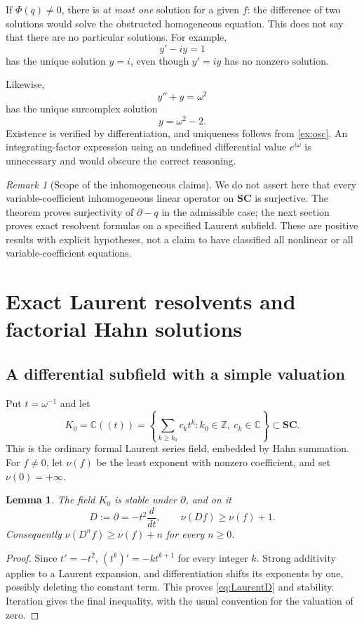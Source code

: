 \documentclass[11pt,letterpaper]{article}
\numberwithin{equation}{section}
\newtheorem{lemma}[lemma]{Lemma}
\theoremstyle{definition}
\theoremstyle{remark}
\newtheorem{remark}[remark]{Remark}
\newcommand{\SC}{\mathbf{SC}}
\newcommand{\C}{\mathbb C}
\newcommand{\Z}{\mathbb Z}
\newcommand{\der}{\partial}
\begin{document}
If $\Phi(q)\ne0$, there is \emph{at most one} solution for a given $f$: the difference of two solutions would solve the obstructed homogeneous equation. This does not say that there are no particular solutions. For example,
\[
 y'-iy=1
\]
has the unique solution $y=i$, even though $y'=iy$ has no nonzero solution.

Likewise,
\[
 y''+y=\omega^2
\]
has the unique surcomplex solution
\[
 y=\omega^2-2.
\]
Existence is verified by differentiation, and uniqueness follows from \cref{ex:osc}. An integrating-factor expression using an undefined differential value $e^{i\omega}$ is unnecessary and would obscure the correct reasoning.

\begin{remark}[Scope of the inhomogeneous claims]
We do not assert here that every variable-coefficient inhomogeneous linear operator on $\SC$ is surjective. The theorem proves surjectivity of $\der-q$ in the admissible case; the next section proves exact resolvent formulas on a specified Laurent subfield. These are positive results with explicit hypotheses, not a claim to have classified all nonlinear or all variable-coefficient equations.
\end{remark}

\section{Exact Laurent resolvents and factorial Hahn solutions}\label{sec:resolvent}

\subsection{A differential subfield with a simple valuation}
Put $t=\omega^{-1}$ and let
\[
 K_0=\C((t))=\left\{\sum_{k\geq k_0}c_kt^k:
 k_0\in\Z,\ c_k\in\C\right\}\subset\SC.
\]
This is the ordinary formal Laurent series field, embedded by Hahn summation. For $f\ne0$, let $\nu(f)$ be the least exponent with nonzero coefficient, and set $\nu(0)=+\infty$.

\begin{lemma}\label{lem:LaurentD}
The field $K_0$ is stable under $\der$, and on it
\begin{equation}\label{eq:LaurentD}
 D:=\der=-t^2\frac{d}{dt},\qquad
 \nu(Df)\geq\nu(f)+1.
\end{equation}
Consequently $\nu(D^nf)\geq\nu(f)+n$ for every $n\geq0$.
\end{lemma}
\begin{proof}
Since $t'=-t^2$, $(t^k)'=-kt^{k+1}$ for every integer $k$. Strong additivity applies to a Laurent expansion, and differentiation shifts its exponents by one, possibly deleting the constant term. This proves \eqref{eq:LaurentD} and stability. Iteration gives the final inequality, with the usual convention for the valuation of zero.
\end{proof}
\end{document}
